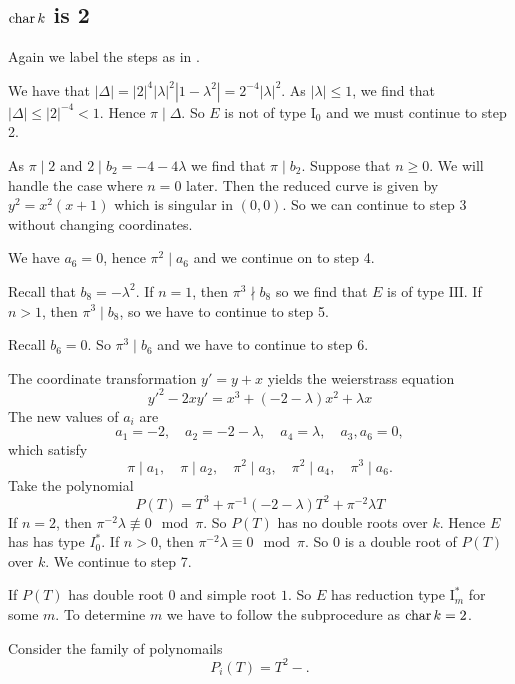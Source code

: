 \subsection{$\operatorname{char} k$ is 2} \label{sec:char_k_is_2}
Again we label the steps as in \cite[sec.\ IV.9]{silvermanAdvancedTopicsArithmetic1994}.

We have that $|\Delta| = |2|^{4} |\lambda|^2 |1-\lambda^2| = 2^{-4}|\lambda|^2$.
As $|\lambda|\le 1$, we find that $|\Delta| \le |2|^{-4} < 1$. 
Hence $\pi \mid \Delta$. So $E$ is not of type $\mathrm I_0$ and we must continue to step 2.

As $\pi \mid 2$ and $2 \mid b_2 = -4 - 4\lambda$ we find that $\pi \mid b_2$. 
Suppose that $n \ge 0$. We will handle the case where $n = 0$ later. 
Then the reduced curve is given by $y^2 = x^2(x+1)$ which is singular in $(0, 0)$. 
So we can continue to step  $3$ without changing coordinates. 

We have $a_6 = 0$, hence $\pi^2 \mid a_6$ and we continue on to step 4.

Recall that  $b_8 = -\lambda^2$. 
If  $n = 1$, then $\pi^3 \nmid b_8$ so we find that $E$ is of type $\mathrm{III}$.
If  $n > 1$, then $\pi^3 \mid b_8$, so we have to continue to step 5.

Recall $b_6 = 0$. So $\pi^3 \mid b_6$ and we have to continue to step 6.

The coordinate transformation $y' = y + x$ yields the weierstrass equation  \[
	y'^2 - 2xy'  = x^3 + (-2 - \lambda)x^2 + \lambda x
\]
The new values of $a_i$ are \[
a_1 = -2,\quad a_2 = -2 -\lambda,\quad a_4 = \lambda,\quad a_3,a_6 =0
,\] 
which satisfy \[
\pi \mid a_1,\quad \pi\mid a_2,\quad  \pi^2 \mid a_3,\quad \pi^2 \mid a_4,\quad \pi^3 \mid a_6
.\] 
Take the polynomial \[
	P(T) = T^3 + \pi^{-1}(-2 -\lambda ) T^2 + \pi^{-2}\lambda T 
\] 
If $n = 2$, then $\pi^{-2}\lambda \not\equiv 0 \mod \pi$. 
So $P(T)$ has no double roots over $k$.
Hence $E$ has has type $I_0^*$. 
If $n >0$, then $\pi^{-2} \lambda \equiv 0 \mod \pi$.
So $0$ is a double root of $P(T)$ over $k$. 
We continue to step 7.

If $P(T)$ has double root  $0$ and simple root $1$. 
So  $E$ has reduction type $\mathrm I_m^*$ for some $m$.
To determine $m$ we have to follow the subprocedure as $\operatorname{char} k = 2$.

Consider the family of polynomails \[
	P_i(T) = T^2 - 
.\] 










